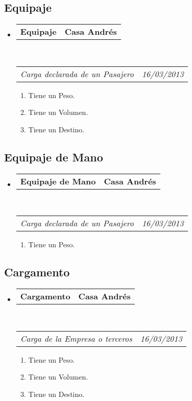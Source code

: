 \documentclass[10pt,letterpaper]{article}
\makeatletter
\newcommand{\headerrow}[2]
{\begin{tabular*}{\linewidth}{l@{\extracolsep{\fill}}r}
	#1 &
	#2 \\
\end{tabular*}}
\makeatother
\begin{document}
\subsection*{Equipaje}

\begin{itemize}
	\parskip=0.1em

	\item
	\headerrow
		{\textbf{Equipaje}}
		{\textbf{Casa Andrés}}
	\\
	\headerrow
		{\emph{Carga declarada de un Pasajero}}
		{\emph{16/03/2013}}
	\begin{enumerate}
		\item Tiene un Peso.
		\item Tiene un Volumen.
		\item Tiene un Destino.
	\end{enumerate}

\end{itemize}


\subsection*{Equipaje de Mano}

\begin{itemize}
	\parskip=0.1em

	\item
	\headerrow
		{\textbf{Equipaje de Mano}}
		{\textbf{Casa Andrés}}
	\\
	\headerrow
		{\emph{Carga declarada de un Pasajero}}
		{\emph{16/03/2013}}
	\begin{enumerate}
		\item Tiene un Peso.
	\end{enumerate}

\end{itemize}

\subsection*{Cargamento}

\begin{itemize}
	\parskip=0.1em

	\item
	\headerrow
		{\textbf{Cargamento}}
		{\textbf{Casa Andrés}}
	\\
	\headerrow
		{\emph{Carga de la Empresa o terceros}}
		{\emph{16/03/2013}}
	\begin{enumerate}
		\item Tiene un Peso.
		\item Tiene un Volumen.
		\item Tiene un Destino.
	\end{enumerate}

\end{itemize}
\end{document}
